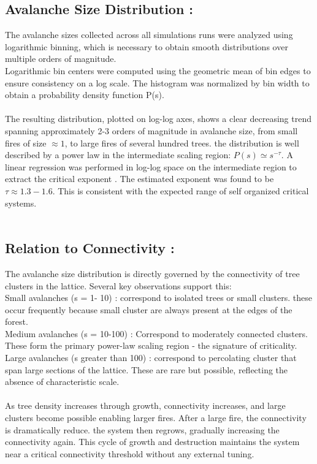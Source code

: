 \documentclass{article}
\begin{document}
\subsection{Avalanche Size Distribution :} 
The avalanche sizes collected across all simulations runs were analyzed using logarithmic binning, which is necessary to obtain smooth distributions over multiple orders of magnitude.\\
Logarithmic bin centers were computed using the geometric mean of bin edges to ensure consistency on a log scale. The histogram was normalized by bin width to obtain a probability density function P(s).\\
\\
The resulting distribution, plotted on log-log axes, shows a clear decreasing trend spanning approximately 2-3 orders of magnitude in avalanche size, from small fires of size $\approx 1$, to large fires of several hundred trees. the distribution is well described by a power law in the intermediate scaling region:
$ P(s) \simeq s^{-\tau} $. A linear regression was performed in log-log space on the intermediate region to extract the critical exponent \tau. The estimated exponent was found to be $\tau \approx 1.3 - 1.6$.
This is consistent with the expected range of self organized critical systems.\\
\\
\subsection{Relation to Connectivity :}
The avalanche size distribution is directly governed by the connectivity of tree clusters in the lattice. Several key observations support this: \\
Small avalanches (s = 1- 10) : correspond to isolated trees or small clusters. these occur frequently because small cluster are always present at the edges of the forest.\\
Medium avalanches (s = 10-100) : Correspond to moderately connected clusters. These form the primary power-law scaling region - the signature of criticality.\\
Large avalanches (s greater than 100) :  correspond to percolating cluster that span large sections of the lattice. These are rare but possible, reflecting the absence of characteristic scale.\\
\\
As tree density increases through growth, connectivity increases, and large clusters become possible enabling larger fires. After a large fire, the connectivity is dramatically reduce. the system then regrows, gradually increasing the connectivity again. This cycle of growth and destruction maintains the system near a critical connectivity threshold without any external tuning.\\
\\
\end{document}
